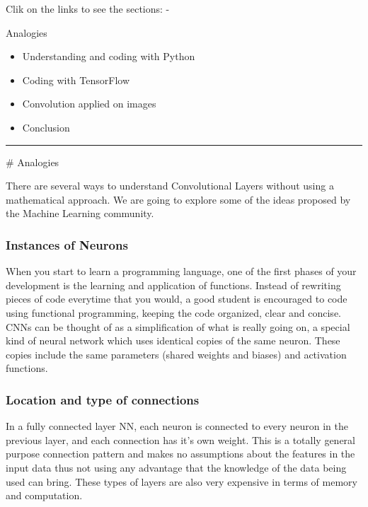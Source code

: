 \documentclass[11pt]{article}
\begin{document}
Clik on the links to see the sections: -

Analogies

\begin{itemize}
\item
  Understanding and coding with Python
\item
  Coding with TensorFlow
\item
  Convolution applied on images
\item
  Conclusion
\end{itemize}

\begin{center}\rule{0.5\linewidth}{\linethickness}\end{center}

     \# Analogies

There are several ways to understand Convolutional Layers without using
a mathematical approach. We are going to explore some of the ideas
proposed by the Machine Learning community.

\subsubsection{Instances of Neurons}\label{instances-of-neurons}

When you start to learn a programming language, one of the first phases
of your development is the learning and application of functions.
Instead of rewriting pieces of code everytime that you would, a good
student is encouraged to code using functional programming, keeping the
code organized, clear and concise. CNNs can be thought of as a
simplification of what is really going on, a special kind of neural
network which uses identical copies of the same neuron. These copies
include the same parameters (shared weights and biases) and activation
functions.

    \subsubsection{Location and type of
connections}\label{location-and-type-of-connections}

In a fully connected layer NN, each neuron is connected to every neuron
in the previous layer, and each connection has it's own weight. This is
a totally general purpose connection pattern and makes no assumptions
about the features in the input data thus not using any advantage that
the knowledge of the data being used can bring. These types of layers
are also very expensive in terms of memory and computation.
\end{document}
